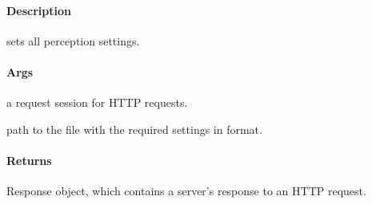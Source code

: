 \documentclass[letterpaper,10pt,english]{sphinxmanual}
\begin{document}
\begin{fulllineitems}
\label{\detokenize{gemini_perception_API:gemini_perception_API.set_perception_setting}}
\pysigstartsignatures
{}
\pysigstopsignatures

\paragraph{Description}
\label{\detokenize{gemini_perception_API:id41}}
\sphinxAtStartPar
sets all perception settings.


\paragraph{Args}
\label{\detokenize{gemini_perception_API:id42}}\begin{description}
\sphinxAtStartPar
a request session for HTTP requests.

\sphinxAtStartPar
path to the file with the required settings in  format.

\end{description}


\paragraph{Returns}
\label{\detokenize{gemini_perception_API:id43}}\begin{description}
\sphinxAtStartPar
Response object, which contains a server’s response to an HTTP request.

\end{description}

\end{fulllineitems}


\begin{fulllineitems}
\label{\detokenize{gemini_perception_API:gemini_perception_API.set_underlay_config}}
\pysigstartsignatures
{}
\pysigstopsignatures
\end{fulllineitems}
\end{document}
